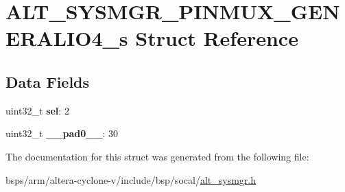\hypertarget{structALT__SYSMGR__PINMUX__GENERALIO4__s}{}\section{A\+L\+T\+\_\+\+S\+Y\+S\+M\+G\+R\+\_\+\+P\+I\+N\+M\+U\+X\+\_\+\+G\+E\+N\+E\+R\+A\+L\+I\+O4\+\_\+s Struct Reference}
\label{structALT__SYSMGR__PINMUX__GENERALIO4__s}
\subsection*{Data Fields}
\begin{DoxyCompactItemize}
\item 
\mbox{\label{structALT__SYSMGR__PINMUX__GENERALIO4__s_aa7a4b0be0a6cd8c867c5af79cb61a48f}} 
uint32\+\_\+t {\bfseries sel}\+: 2
\item 
\mbox{\label{structALT__SYSMGR__PINMUX__GENERALIO4__s_a3c2067f1f64e2aee8a7965441f8c31a1}} 
uint32\+\_\+t {\bfseries \+\_\+\+\_\+pad0\+\_\+\+\_\+}\+: 30
\end{DoxyCompactItemize}


The documentation for this struct was generated from the following file\+:\begin{DoxyCompactItemize}
\item 
bsps/arm/altera-\/cyclone-\/v/include/bsp/socal/\mbox{\hyperlink{alt__sysmgr_8h}{alt\+\_\+sysmgr.\+h}}\end{DoxyCompactItemize}

